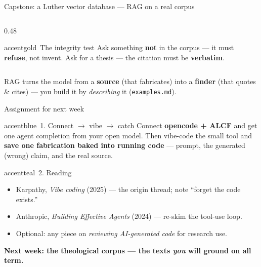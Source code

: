 \begin{frame}{Capstone: a Luther vector database --- RAG on a real corpus}
\begin{columns}[t, totalwidth=\textwidth]
\begin{column}{0.48\textwidth}
\begin{featbox}{accentgold}{\faBalanceScale\ The integrity test}
        \scriptsize Ask something \textbf{not} in the corpus --- it must \textbf{refuse},
        not invent. Ask for a thesis --- the citation must be \textbf{verbatim}.
      \end{featbox}
    \end{column}
  \end{columns}
  \vspace{6pt}
  \begin{center}\small\color{labnavy}%
    RAG turns the model from a \textbf{source} (that fabricates) into a \textbf{finder}
    (that quotes \& cites) --- you build it by \emph{describing} it (\texttt{examples.md}).\end{center}
\end{frame}

\begin{frame}{Assignment for next week}
  \begin{featbox}{accentblue}{\faLaptopCode\ 1. Connect $\to$ vibe $\to$ catch}
    \small
    Connect \textbf{opencode + ALCF} and get one agent completion from your open model.
    Then vibe-code the small tool and \textbf{save one fabrication baked into running
    code} --- prompt, the generated (wrong) claim, and the real source.
  \end{featbox}
  \vspace{7pt}
  \begin{featbox}{accentteal}{\faBookOpen\ 2. Reading}
    \small
    \begin{itemize}
      \item Karpathy, \emph{Vibe coding} (2025) --- the origin thread; note ``forget the code exists.''
      \item Anthropic, \emph{Building Effective Agents} (2024) --- re-skim the tool-use loop.
      \item Optional: any piece on \emph{reviewing AI-generated code} for research use.
    \end{itemize}
  \end{featbox}
  \vspace{6pt}
  \begin{center}\small\color{labnavy}\bfseries
    Next week: the theological corpus --- the texts \emph{you} will ground on all term.\end{center}
\end{frame}


